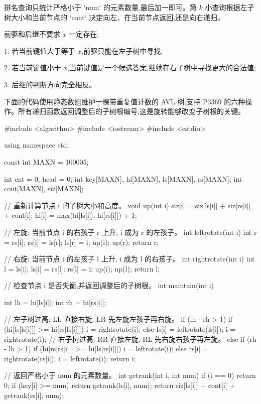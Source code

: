 \documentclass[UTF8,a4paper,11pt]{ctexart}
\newcommand{\topic}[1]{%
  \par\needspace{3\baselineskip}\vspace{0.45em}%
  \noindent{\bfseries\color{Primary}#1}\par\vspace{0.12em}%
}
\begin{document}
排名查询只统计严格小于 `num` 的元素数量,最后加一即可。第 $k$ 小查询根据左子树大小和当前节点的 `cont` 决定向左、在当前节点返回,还是向右递归。

前驱和后继不要求 $x$ 一定存在:

1. 若当前键值大于等于 $x$,前驱只能在左子树中寻找;

2. 若当前键值小于 $x$,当前键值是一个候选答案,继续在右子树中寻找更大的合法值;

3. 后继的判断方向完全相反。

\topic{P3369 AVL 模板代码}

下面的代码使用静态数组维护一棵带重复值计数的 AVL 树,支持 P3369 的六种操作。所有递归函数返回调整后的子树根编号,这是旋转能够改变子树根的关键。

\begin{CodeBlock}
#include <algorithm>
#include <iostream>
#include <cstdio>

using namespace std;

const int MAXN = 100005;

int cnt = 0, head = 0;
int key[MAXN], hi[MAXN], ls[MAXN], rs[MAXN];
int cont[MAXN], siz[MAXN];

// 重新计算节点 i 的子树大小和高度。
void up(int i) {
    siz[i] = siz[ls[i]] + siz[rs[i]] + cont[i];
    hi[i] = max(hi[ls[i]], hi[rs[i]]) + 1;
}

// 左旋: 当前节点 i 的右孩子 r 上升, i 成为 r 的左孩子。
int leftrotate(int i) {
    int r = rs[i];
    rs[i] = ls[r];
    ls[r] = i;
    up(i);
    up(r);
    return r;
}

// 右旋: 当前节点 i 的左孩子 l 上升, i 成为 l 的右孩子。
int rightrotate(int i) {
    int l = ls[i];
    ls[i] = rs[l];
    rs[l] = i;
    up(i);
    up(l);
    return l;
}

// 检查节点 i 是否失衡,并返回调整后的子树根。
int maintain(int i) {
    int lh = hi[ls[i]];
    int rh = hi[rs[i]];

    // 左子树过高: LL 直接右旋, LR 先左旋左孩子再右旋。
    if (lh - rh > 1) {
        if (hi[ls[ls[i]]] >= hi[rs[ls[i]]])
            i = rightrotate(i);
        else {
            ls[i] = leftrotate(ls[i]);
            i = rightrotate(i);
        }
    }
    // 右子树过高: RR 直接左旋, RL 先右旋右孩子再左旋。
    else if (rh - lh > 1) {
        if (hi[rs[rs[i]]] >= hi[ls[rs[i]]])
            i = leftrotate(i);
        else {
            rs[i] = rightrotate(rs[i]);
            i = leftrotate(i);
        }
    }
    return i;
}

// 返回严格小于 num 的元素数量。
int getrank(int i, int num) {
    if (i == 0)
        return 0;
    if (key[i] >= num)
        return getrank(ls[i], num);
    return siz[ls[i]] + cont[i] + getrank(rs[i], num);
}


\end{CodeBlock}
\end{document}
